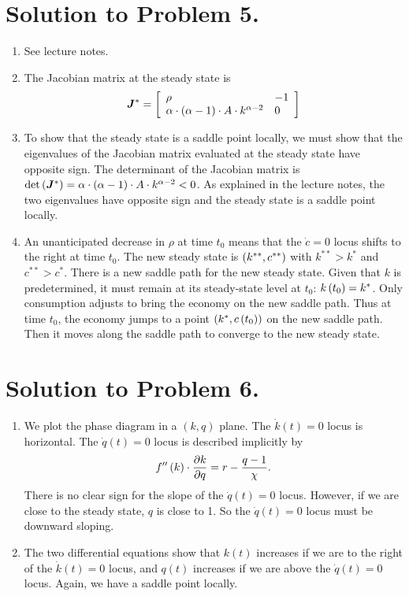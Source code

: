 \documentclass[letterpaper,12pt,leqno]{article}
\begin{document}
\section*{Solution to Problem 5.}
\begin{enumerate}
\item See lecture notes.
\item  The Jacobian matrix at the steady state is
\begin{align*}
\bm{J}^{*}=\left[ 
\begin{array}{ll}
\rho  & -1 \\ 
\alpha \cdot \left( \alpha -1 \right)\cdot  A\cdot k^{\alpha -2} & 0
\end{array} \right] 
\end{align*}
\item To show that the steady state is a saddle point locally, we must show that the eigenvalues of the Jacobian matrix evaluated at the steady state have opposite sign. The determinant of the Jacobian matrix is  $\det \left( \bm{J}^{*} \right) =\alpha\cdot  \left( \alpha -1 \right)\cdot A\cdot k^{\alpha -2}<0$. As explained in the lecture notes, the two eigenvalues have opposite sign and the steady state is a saddle point locally.

\item An unanticipated decrease in $\rho $ at time $t_{0}$ means that the $\dot{c}=0$ locus shifts to the right at time $t_{0}$. The new steady state is $\left( k^{**},c^{**} \right) $ with $k^{* *}>k^*$ and $c^{* *}>c^*$. There is a new saddle path for the new steady state. Given that $k$ is predetermined, it must remain at its steady-state level at $t_{0}$: $k\left( t_{0} \right) =k^*$. Only consumption adjusts to bring the economy on the new saddle path. Thus at time $t_{0}$, the economy jumps to a point $\left( k^*,c\left( t_{0} \right) \right)$ on the new saddle path. Then it moves along the saddle path to converge to the new steady state.
\end{enumerate}

\section*{Solution to Problem 6.}
\begin{enumerate}
\item We plot the phase diagram in a $(k,q)$ plane. The $\dot{k}(t)=0$ locus is horizontal. The $\dot{q}(t)=0$ locus is described implicitly by
\begin{align*}
f''\left( k \right) \cdot \frac{\partial k}{\partial q}=r-\frac{q-1}{\chi}.
\end{align*}
There is no clear sign for the slope of the $\dot{q}(t)=0$ locus. However, if we are close to the steady state,  $q$ is close to 1. So the $\dot{q}(t)=0$ locus must be downward sloping.
\item The two differential equations show that $k(t)$ increases if we are to the right of the $\dot{k}(t)=0$ locus, and $q(t)$ increases if we are above the $\dot{q}(t)=0$ locus. Again, we have a saddle point locally.
\end{enumerate}
\end{document}
